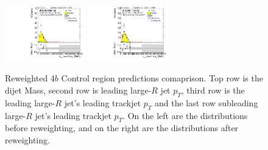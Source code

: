\begin{figure}[htbp!]
\begin{center}
\includegraphics[width=0.31\textwidth,angle=-90]{figures/boosted/Prereweight/Moriond_FourTag_Control_sublHCand_trk0_Pt.pdf}
\includegraphics[width=0.31\textwidth,angle=-90]{figures/boosted/Control/b77_FourTag_Control_sublHCand_trk0_Pt.pdf}\\
\caption{Reweighted 4$b$ Control region predictions comaprison. Top row is the dijet Mass, second row is leading large-$R$ jet $p_{T}$, third row is the leading large-$R$ jet's leading trackjet $p_T$ and the last row subleading large-$R$ jet's leading trackjet $p_T$. On the left are the distributions before reweighting, and on the right are the distributions after reweighting.}
\label{fig:rw-4b-comp-cr}
\end{center}
\end{figure}

\clearpage
